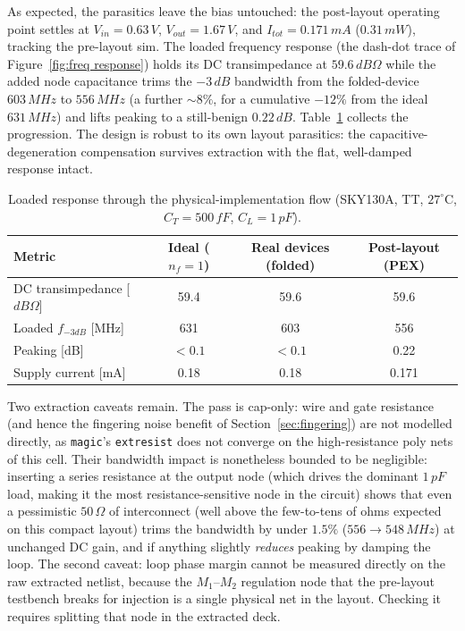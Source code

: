 \documentclass{article}
\begin{document}
As expected, the parasitics leave the bias untouched: the post-layout operating point settles at
$V_{in}=0.63\,V$, $V_{out}=1.67\,V$, and $I_{tot}=0.171\,mA$ ($0.31\,mW$), tracking the
pre-layout sim. The loaded frequency response (the dash-dot trace of
Figure~\ref{fig:freq response}) holds its DC transimpedance at $59.6\,dB\Omega$ while the added
node capacitance trims the $-3\,dB$ bandwidth from the folded-device $603\,MHz$ to $556\,MHz$
(a further ${\sim}8\%$, for a cumulative $-12\%$ from the ideal $631\,MHz$) and lifts peaking to
a still-benign $0.22\,dB$. Table~\ref{tab:pex} collects the progression. The design is robust to
its own layout parasitics: the capacitive-degeneration compensation survives extraction with the
flat, well-damped response intact.

\begin{table}[H]
    \centering
    \caption{Loaded response through the physical-implementation flow (SKY130A, TT, $27^\circ$C,
    $C_T=500\,fF$, $C_L=1\,pF$).}
    \label{tab:pex}
    \begin{tabular}{l|c|c|c} \hline
        \textbf{Metric} & \textbf{Ideal ($n_f{=}1$)} & \textbf{Real devices (folded)} & \textbf{Post-layout (PEX)} \\ \hline
        DC transimpedance [$dB\Omega$] & 59.4 & 59.6 & 59.6 \\ \hline
        Loaded $f_{-3dB}$ [MHz]        & 631  & 603  & 556  \\ \hline
        Peaking [dB]                   & $<0.1$ & $<0.1$ & 0.22 \\ \hline
        Supply current [mA]            & 0.18 & 0.18 & 0.171 \\ \hline
    \end{tabular}
\end{table}

Two extraction caveats remain. The pass is cap-only: wire and gate resistance (and hence the
fingering noise benefit of Section~\ref{sec:fingering}) are not modelled directly, as
\texttt{magic}'s \texttt{extresist} does not converge on the high-resistance poly nets of this
cell. Their bandwidth impact is nonetheless bounded to be negligible: inserting a series
resistance at the output node (which drives the dominant $1\,pF$ load, making it the most
resistance-sensitive node in the circuit) shows that even a pessimistic $50\,\Omega$ of
interconnect (well above the few-to-tens of ohms expected on this compact layout) trims the
bandwidth by under $1.5\%$ ($556\to548\,MHz$) at unchanged DC gain, and if anything slightly
\emph{reduces} peaking by damping the loop. The second caveat: loop phase margin cannot be
measured directly on the raw extracted netlist, because the $M_1$--$M_2$ regulation node that the
pre-layout testbench breaks for injection is a single physical net in the layout. Checking it
requires splitting that node in the extracted deck.
\end{document}
